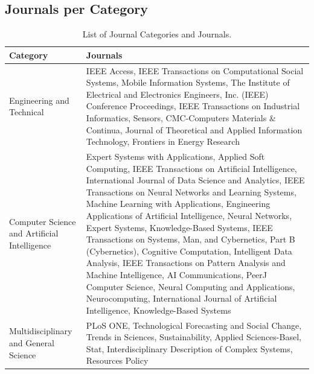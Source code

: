 \subsection{Journals per Category}
\label{appendix:journal_category_mapping}

\renewcommand{\thetable}{D\arabic{table}} %
\setcounter{table}{0} %

\begin{table}[H]
    \centering
    \caption[Journal Categories Mapping]{List of Journal Categories and Journals.}
    \label{table:journal_categories}
    \small
    \begin{adjustbox}{width=1\textwidth,center}
    \begin{tabular}{p{} p{}}
        \toprule
        \textbf{Category} & \textbf{Journals} \\
        \midrule
        Engineering and Technical & IEEE Access, IEEE Transactions on Computational Social Systems, Mobile Information Systems, The Institute of Electrical and Electronics Engineers, Inc. (IEEE) Conference Proceedings, IEEE Transactions on Industrial Informatics, Sensors, CMC-Computers Materials \& Continua, Journal of Theoretical and Applied Information Technology, Frontiers in Energy Research \\
        \addlinespace
        \hdashline[0.2pt/3pt]
        \addlinespace
        Computer Science and Artificial Intelligence & Expert Systems with Applications, Applied Soft Computing, IEEE Transactions on Artificial Intelligence, International Journal of Data Science and Analytics, IEEE Transactions on Neural Networks and Learning Systems, Machine Learning with Applications, Engineering Applications of Artificial Intelligence, Neural Networks, Expert Systems, Knowledge-Based Systems, IEEE Transactions on Systems, Man, and Cybernetics, Part B (Cybernetics), Cognitive Computation, Intelligent Data Analysis, IEEE Transactions on Pattern Analysis and Machine Intelligence, AI Communications, PeerJ Computer Science, Neural Computing and Applications, Neurocomputing, International Journal of Artificial Intelligence, Knowledge-Based Systems \\
        \addlinespace
        \hdashline[0.2pt/3pt]
        \addlinespace
        Multidisciplinary and General Science & PLoS ONE, Technological Forecasting and Social Change, Trends in Sciences, Sustainability, Applied Sciences-Basel, Stat, Interdisciplinary Description of Complex Systems, Resources Policy \\

\end{tabular}
\end{adjustbox}
\end{table}
